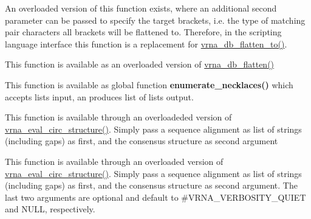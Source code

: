 \begin{DoxyRefList}
An overloaded version of this function exists, where an additional second parameter can be passed to specify the target brackets, i.\+e. the type of matching pair characters all brackets will be flattened to. Therefore, in the scripting language interface this function is a replacement for \hyperlink{group__struct__utils_ga690425199c8b71545e7196e3af1436f8}{vrna\+\_\+db\+\_\+flatten\+\_\+to()}.  
\item[\label{wrappers__wrappers000089}%
\Hypertarget{wrappers__wrappers000089}%
Global \hyperlink{group__struct__utils_ga690425199c8b71545e7196e3af1436f8}{vrna\+\_\+db\+\_\+flatten\+\_\+to} (char $\ast$string, const char target\mbox{[}3\mbox{]}, unsigned int options)]This function is available as an overloaded version of \hyperlink{group__struct__utils_gae966b9f44168a4f4b39ca42ffb5f37b7}{vrna\+\_\+db\+\_\+flatten()}  
\item[\label{wrappers__wrappers000003}%
\Hypertarget{wrappers__wrappers000003}%
Global \hyperlink{group__utils_gae081ac655a76bd5c4b3d86c60b096b75}{vrna\+\_\+enumerate\+\_\+necklaces} (const unsigned int $\ast$type\+\_\+counts)]This function is available as global function {\bfseries enumerate\+\_\+necklaces()} which accepts lists input, an produces list of lists output.  
\item[\label{wrappers__wrappers000040}%
\Hypertarget{wrappers__wrappers000040}%
Global \hyperlink{group__eval_gac96577cf232c71160f762737a994b7c6}{vrna\+\_\+eval\+\_\+circ\+\_\+consensus\+\_\+structure} (const char $\ast$$\ast$alignment, const char $\ast$structure)]This function is available through an overloadeded version of \hyperlink{group__eval_ga3e05a23ddf9b083f4e69881e440d4866}{vrna\+\_\+eval\+\_\+circ\+\_\+structure()}. Simply pass a sequence alignment as list of strings (including gaps) as first, and the consensus structure as second argument  
\item[\label{wrappers__wrappers000050}%
\Hypertarget{wrappers__wrappers000050}%
Global \hyperlink{group__eval_gae89240c230e4740b22a703ee953396b9}{vrna\+\_\+eval\+\_\+circ\+\_\+consensus\+\_\+structure\+\_\+v} (const char $\ast$$\ast$alignment, const char $\ast$structure, int verbosity\+\_\+level, F\+I\+LE $\ast$file)]This function is available through an overloaded version of \hyperlink{group__eval_ga3e05a23ddf9b083f4e69881e440d4866}{vrna\+\_\+eval\+\_\+circ\+\_\+structure()}. Simply pass a sequence alignment as list of strings (including gaps) as first, and the consensus structure as second argument. The last two arguments are optional and default to \#\+V\+R\+N\+A\+\_\+\+V\+E\+R\+B\+O\+S\+I\+T\+Y\+\_\+\+Q\+U\+I\+ET and N\+U\+LL, respectively.  

\end{DoxyRefList}

